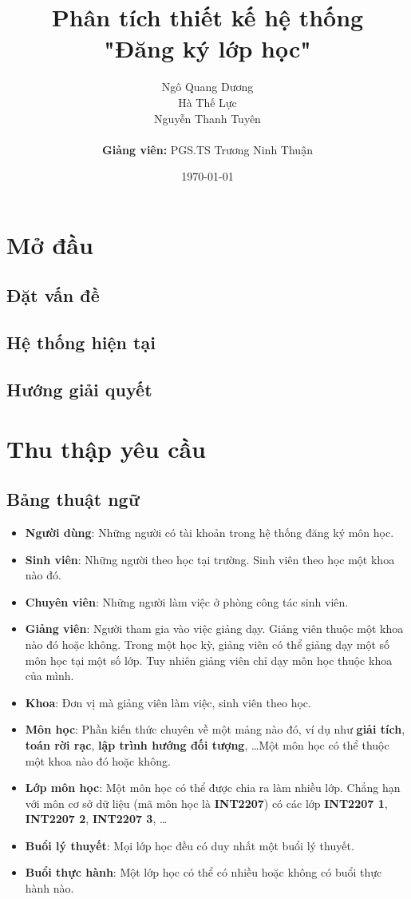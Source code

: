 \documentclass[12pt]{book}
\title{\textbf{Phân tích thiết kế hệ thống\\
"Đăng ký lớp học"}}
\author{
  Ngô Quang Dương \\
  Hà Thế Lực \\
  Nguyễn Thanh Tuyên \\
  \\
  \textbf{Giảng viên: }PGS.TS Trương Ninh Thuận
}
\date{\today}
\begin{document}
\maketitle

\tableofcontents

\chapter{Mở đầu}

  \section{Đặt vấn đề}

  \section{Hệ thống hiện tại}

  \section{Hướng giải quyết}

\chapter{Thu thập yêu cầu}
  
  \section{Bảng thuật ngữ}
    \begin{itemize}
      \item \textbf{Người dùng}: Những người có tài khoản trong hệ thống đăng ký môn học.
      \item \textbf{Sinh viên}: Những người theo học tại trường. Sinh viên theo học một khoa nào đó.
      \item \textbf{Chuyên viên}: Những người làm việc ở phòng công tác sinh viên.
      \item \textbf{Giảng viên}: Người tham gia vào việc giảng dạy. Giảng viên thuộc một khoa nào đó hoặc không. Trong một học kỳ, giảng viên có thể giảng dạy một số môn học tại một số lớp. Tuy nhiên giảng viên chỉ dạy môn học thuộc khoa của mình.
      \item \textbf{Khoa}: Đơn vị mà giảng viên làm việc, sinh viên theo học.
      \item \textbf{Môn học}: Phần kiến thức chuyên về một mảng nào đó, ví dụ như \textbf{giải tích}, \textbf{toán rời rạc}, \textbf{lập trình hướng đối tượng}, \ldots Một môn học có thể thuộc một khoa nào đó hoặc không.
      \item \textbf{Lớp môn học}: Một môn học có thể được chia ra làm nhiều lớp. Chẳng hạn với môn cơ sở dữ liệu (mã môn học là \textbf{INT2207}) có các lớp \textbf{INT2207 1}, \textbf{INT2207 2}, \textbf{INT2207 3}, \ldots
      \item \textbf{Buổi lý thuyết}: Mọi lớp học đều có duy nhất một buổi lý thuyết.
      \item \textbf{Buổi thực hành}: Một lớp học có thể có nhiều hoặc không có buổi thực hành nào.
    \end{itemize}
  
\end{document}
